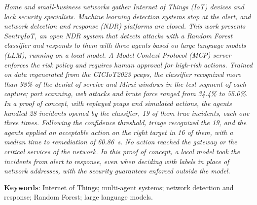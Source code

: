 \textit{Home and small-business networks gather Internet of Things (IoT) devices and lack security specialists. Machine learning detection systems stop at the alert, and network detection and response (NDR) platforms are closed. This work presents SentryIoT, an open NDR system that detects attacks with a Random Forest classifier and responds to them with three agents based on large language models (LLM), running on a local model. A Model Context Protocol (MCP) server enforces the risk policy and requires human approval for high-risk actions. Trained on data regenerated from the CICIoT2023 pcaps, the classifier recognized more than 98\% of the denial-of-service and Mirai windows in the test segment of each capture; port scanning, web attacks and brute force ranged from 34.4\% to 55.0\%. In a proof of concept, with replayed pcaps and simulated actions, the agents handled 28 incidents opened by the classifier, 19 of them true incidents, each one three times. Following the confidence threshold, triage recognized the 19, and the agents applied an acceptable action on the right target in 16 of them, with a median time to remediation of 60.86~s. No action reached the gateway or the critical services of the network. In this proof of concept, a local model took the incidents from alert to response, even when deciding with labels in place of network addresses, with the security guarantees enforced outside the model.}

\vspace{\onelineskip}

\noindent
\textbf{Keywords}: Internet of Things; multi-agent systems; network detection and response; Random Forest; large language models.
